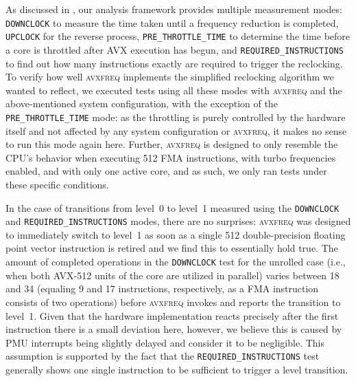As discussed in , our analysis framework provides multiple measurement modes: \texttt{DOWNCLOCK} to measure the time taken until a frequency reduction is completed, \texttt{UPCLOCK} for the reverse process, \texttt{PRE\_THROTTLE\_TIME} to determine the time before a core is throttled after \gls{AVX} execution has begun, and \texttt{REQUIRED\_INSTRUCTIONS} to find out how many instructions exactly are required to trigger the reclocking. To verify how well \textsc{avxfreq} implements the simplified reclocking algorithm we wanted to reflect, we executed tests using all these modes with \textsc{avxfreq} and the above-mentioned system configuration, with the exception of the \texttt{PRE\_THROTTLE\_TIME} mode: as the throttling is purely controlled by the hardware itself and not affected by any system configuration or \textsc{avxfreq}, it makes no sense to run this mode again here. Further, \textsc{avxfreq} is designed to only resemble the \gls{CPU}'s behavior when executing \SI{512}{\bit} \gls{FMA} instructions, with turbo frequencies enabled, and with only one active core, and as such, we only ran tests under these specific conditions.

In the case of transitions from level~0 to level~1 measured using the \texttt{DOWNCLOCK} and \texttt{REQUIRED\_INSTRUCTIONS} modes, there are no surprises: \textsc{avxfreq} was designed to immediately switch to level~1 as soon as a single \SI[number-unit-product=-]{512}{\bit} double-precision floating point vector instruction is retired and we find this to essentially hold true. The amount of completed operations in the \texttt{DOWNCLOCK} test for the unrolled case (i.e., when both \gls{AVX-512} units of the core are utilized in parallel) varies between 18 and 34 (equaling 9 and 17 instructions, respectively, as a \gls{FMA} instruction consists of two operations) before \textsc{avxfreq} invokes and reports the transition to level~1. Given that the hardware implementation reacts precisely after the first instruction there is a small deviation here, however, we believe this is caused by \gls{PMU} interrupts being slightly delayed and consider it to be negligible. This assumption is supported by the fact that the \texttt{REQUIRED\_INSTRUCTIONS} test generally shows one single instruction to be sufficient to trigger a level transition.

